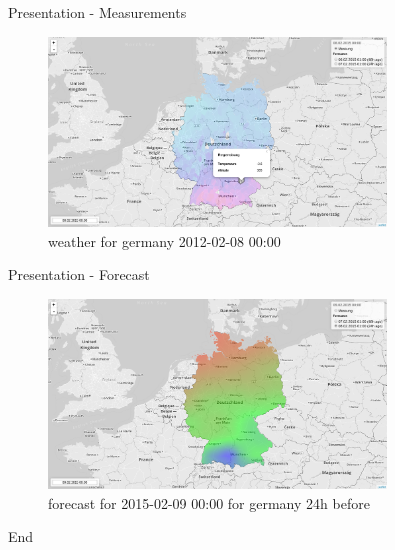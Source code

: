 \documentclass[ucs,9pt]{beamer}
\begin{document}
\begin{frame}{Presentation - Measurements}
  \begin{figure}
    \centering
    \includegraphics[width=0.8\textwidth]{images/live_measurement.png}
    \caption{weather for germany 2012-02-08 00:00}
    \label{fig:voronoi}
  \end{figure}
\end{frame}

\begin{frame}{Presentation - Forecast}
  \begin{figure}
    \centering
    \includegraphics[width=0.8\textwidth]{images/live_forecast.png}
    \caption{forecast for 2015-02-09 00:00 for germany 24h before}
    \label{fig:voronoi}
  \end{figure}
\end{frame}

\begin{frame}{End}
  \\
  \\
\end{frame}
\end{document}
